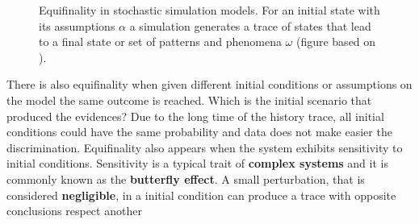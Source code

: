 \documentclass[11pt,oneside,a4paper,openright]{report}
\begin{document}
\begin{figure}[!htb]
\centering
\setlength\fboxsep{0pt}
\setlength\fboxrule{0.5pt}
\caption{Equifinality in stochastic simulation models. For an initial state 
	with its assumptions $\alpha$ a simulation generates a trace of states 
	that lead to a final state or set of patterns and phenomena $\omega$ (figure based on \cite{Premo2010}).}
\label{fig:Equifinality1}
\end{figure}
%
There is also equifinality when given different initial conditions or assumptions on the model the same outcome is reached. Which is the initial scenario that produced the evidences? Due to the long time of the history trace, all initial conditions could have the same probability and data does not make easier the discrimination. Equifinality also appears when the system exhibits sensitivity to initial conditions. Sensitivity is a typical trait of \textbf{complex systems} and it is commonly known as the \textbf{butterfly effect}. A small perturbation, that is considered \textbf{negligible}, in a initial condition can produce a trace with opposite conclusions respect another 
\end{document}
